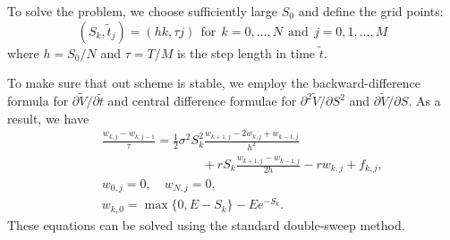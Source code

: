 \begin{example}
To solve the problem, we choose sufficiently large $S_{0}$ and define the grid points:
\[
(S_k,\tilde{t}_j)=(hk, \tau j) \ \ \text{for} \ \ k=0,\dots,N \ \ \text{and} \ \ j=0, 1, \dots, M
\]
where $h=S_{0}/N$ and $\tau=T/M$ is the step length in time $\tilde{t}$.

To make sure  that out scheme is stable, we employ the backward-difference formula
for $\partial \tilde{V}/\partial \tilde{t}$ and central difference formulae for
$\partial^{2} \tilde{V}/\partial S^{2}$ and $\partial \tilde{V}/\partial S$.
As  a result, we have
\begin{eqnarray}
    &&\frac{w_{k,j}-w_{k,j-1}}{\tau}=\frac{1}{2}\sigma^{2}S_k^{2}
    \frac{w_{k+1,j}-2w_{k,j}+w_{k-1,j}}{h^2}\nonumber\\
    &&\qquad\qquad\qquad\qquad+rS_k\frac{w_{k+1,j}-w_{k-1,j}}{2h}
    -r w_{k,j}+f_{k,j}, \label{BS9} \\
    &&w_{0,j}=0, \quad w_{N,j}=0 , \label{BS11} \\
    &&w_{k,0}=\max\{0,E-S_k\}-E e^{-S_k}. \label{BS12}
\end{eqnarray}
These equations can be solved using the standard double-sweep method.
\end{example}

